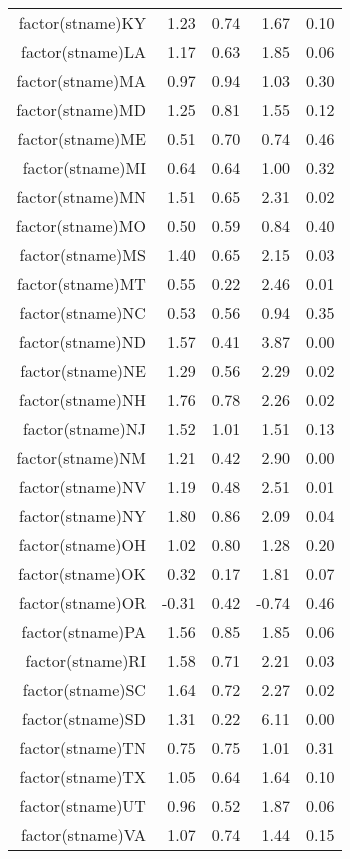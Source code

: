 \begin{table}[ht]
\begin{tabular}{rrrrr}
  factor(stname)KY & 1.23 & 0.74 & 1.67 & 0.10 \\ 
  factor(stname)LA & 1.17 & 0.63 & 1.85 & 0.06 \\ 
  factor(stname)MA & 0.97 & 0.94 & 1.03 & 0.30 \\ 
  factor(stname)MD & 1.25 & 0.81 & 1.55 & 0.12 \\ 
  factor(stname)ME & 0.51 & 0.70 & 0.74 & 0.46 \\ 
  factor(stname)MI & 0.64 & 0.64 & 1.00 & 0.32 \\ 
  factor(stname)MN & 1.51 & 0.65 & 2.31 & 0.02 \\ 
  factor(stname)MO & 0.50 & 0.59 & 0.84 & 0.40 \\ 
  factor(stname)MS & 1.40 & 0.65 & 2.15 & 0.03 \\ 
  factor(stname)MT & 0.55 & 0.22 & 2.46 & 0.01 \\ 
  factor(stname)NC & 0.53 & 0.56 & 0.94 & 0.35 \\ 
  factor(stname)ND & 1.57 & 0.41 & 3.87 & 0.00 \\ 
  factor(stname)NE & 1.29 & 0.56 & 2.29 & 0.02 \\ 
  factor(stname)NH & 1.76 & 0.78 & 2.26 & 0.02 \\ 
  factor(stname)NJ & 1.52 & 1.01 & 1.51 & 0.13 \\ 
  factor(stname)NM & 1.21 & 0.42 & 2.90 & 0.00 \\ 
  factor(stname)NV & 1.19 & 0.48 & 2.51 & 0.01 \\ 
  factor(stname)NY & 1.80 & 0.86 & 2.09 & 0.04 \\ 
  factor(stname)OH & 1.02 & 0.80 & 1.28 & 0.20 \\ 
  factor(stname)OK & 0.32 & 0.17 & 1.81 & 0.07 \\ 
  factor(stname)OR & -0.31 & 0.42 & -0.74 & 0.46 \\ 
  factor(stname)PA & 1.56 & 0.85 & 1.85 & 0.06 \\ 
  factor(stname)RI & 1.58 & 0.71 & 2.21 & 0.03 \\ 
  factor(stname)SC & 1.64 & 0.72 & 2.27 & 0.02 \\ 
  factor(stname)SD & 1.31 & 0.22 & 6.11 & 0.00 \\ 
  factor(stname)TN & 0.75 & 0.75 & 1.01 & 0.31 \\ 
  factor(stname)TX & 1.05 & 0.64 & 1.64 & 0.10 \\ 
  factor(stname)UT & 0.96 & 0.52 & 1.87 & 0.06 \\ 
  factor(stname)VA & 1.07 & 0.74 & 1.44 & 0.15 \\ 

\end{tabular}
\end{table}
